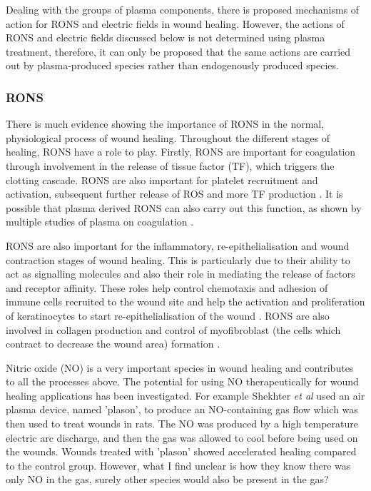 \documentclass[11pt, oneside]{article}   	%
\newcommand{\toref}[1]{ \textcolor{blue}{\bf{REFERENCE #1}}}
\begin{document}
Dealing with the groups of plasma components, there is proposed mechanisms of action for RONS and electric fields in wound healing.
However, the actions of RONS and electric fields discussed below is not determined using plasma treatment, therefore, it can only be proposed that the same actions are carried out by plasma-produced species rather than endogenously produced species.


\subsubsection{RONS}
There is much evidence showing the importance of RONS in the normal, physiological process of wound healing.
Throughout the different stages of healing, RONS have a role to play.
Firstly, RONS are important for coagulation through involvement in the release of tissue factor (TF), which triggers the clotting cascade. RONS are also important for platelet recruitment and activation, subsequent further release of ROS and more TF production \cite{Soneja2005role}.
It is possible that plasma derived RONS can also carry out this function, as shown by multiple studies of plasma on coagulation \cite{Fridman2006blood, Chen2009blood}.

RONS are also important for the inflammatory, re-epithelialisation and wound contraction stages of wound healing.
This is particularly due to their ability to act as signalling molecules and also their role in mediating the release of factors and receptor affinity.
These roles help control chemotaxis and adhesion of immune cells recruited to the wound site and help the activation and proliferation of keratinocytes to start re-epithelialisation of the wound \cite{Soneja2005role}.
RONS are also involved in collagen production and control of myofibroblast (the cells which contract to decrease the wound area) formation \cite{Soneja2005role}.


Nitric oxide (NO) is a very important species in wound healing and contributes to all the processes above.
The potential for using NO therapeutically for wound healing applications has been investigated.
For example Shekhter \textit{et al} \cite{Shekhter2005beneficial} used an air plasma device, named 'plason', to produce an NO-containing gas flow which was then used to treat wounds in rats. 
The NO was produced by a high temperature electric arc discharge, and then the gas was allowed to cool before being used on the wounds. 
Wounds treated with 'plason' showed accelerated healing compared to the control group.
However, what I find unclear is how they know there was only NO in the gas, surely other species would also be present in the gas?
\end{document}
